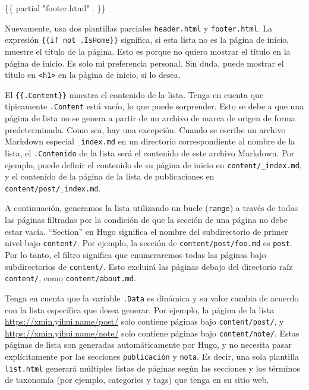 \documentclass[12pt,]{krantz}
\makeatletter
\newenvironment{Shaded}{\begin{snugshade}}{\end{snugshade}}
\newcommand{\NormalTok}[1]{#1}
\newenvironment{kframe}{%
\medskip{}
\setlength{\fboxsep}{.8em}
 \def\at@end@of@kframe{}%
 \ifinner\ifhmode%
  \def\at@end@of@kframe{\end{minipage}}%
  \begin{minipage}{\columnwidth}%
 \fi\fi%
 \def\FrameCommand##1{\hskip\@totalleftmargin \hskip-\fboxsep
 \colorbox{shadecolor}{##1}\hskip-\fboxsep
     \hskip-\linewidth \hskip-\@totalleftmargin \hskip\columnwidth}%
 \MakeFramed {\advance\hsize-\width
   \@totalleftmargin\z@ \linewidth\hsize
   \@setminipage}}%
 {\par\unskip\endMakeFramed%
 \at@end@of@kframe}
\renewenvironment{Shaded}{\begin{kframe}}{\end{kframe}}
\theoremstyle{definition}
\theoremstyle{definition}
\theoremstyle{definition}
\theoremstyle{remark}
\makeatother
\begin{document}
\begin{itemize}
\begin{itemize}
\begin{Shaded}
\begin{Highlighting}[]
\NormalTok{\{\{ partial "footer.html" . \}\}}
\end{Highlighting}
\end{Shaded}

    Nuevamente, usa dos plantillas parciales \texttt{header.html} y
    \texttt{footer.html}. La expresión \texttt{\{\{if\ not\ .IsHome\}\}}
    significa, si esta lista no es la página de inicio, muestre el
    título de la página. Esto es porque no quiero mostrar el título en
    la página de inicio. Es solo mi preferencia personal. Sin duda,
    puede mostrar el título en \texttt{\textless{}h1\textgreater{}} en
    la página de inicio, si lo desea.

    El \texttt{\{\{.Content\}\}} muestra el contenido de la lista. Tenga
    en cuenta que típicamente \texttt{.Content} está vacío, lo que puede
    sorprender. Esto se debe a que una página de lista no se genera a
    partir de un archivo de marca de origen de forma predeterminada.
    Como sea, hay una excepción. Cuando se escribe un archivo Markdown
    especial \texttt{\_index.md} en un directorio correspondiente al
    nombre de la lista, el \texttt{.Contenido} de la lista será el
    contenido de este archivo Markdown. Por ejemplo, puede definir el
    contenido de su página de inicio en \texttt{content/\_index.md}, y
    el contenido de la página de la lista de publicaciones en
    \texttt{content/post/\_index.md}.

    A continuación, generamos la lista utilizando un bucle
    (\texttt{range}) a través de todas las páginas filtradas por la
    condición de que la sección de una página no debe estar vacía.
    ``Section'' en Hugo significa el nombre del subdirectorio de primer
    nivel bajo \texttt{content/}. Por ejemplo, la sección de
    \texttt{content/post/foo.md} es \texttt{post}. Por lo tanto, el
    filtro significa que enumeraremos todas las páginas bajo
    subdirectorios de \texttt{content/}. Esto excluirá las páginas
    debajo del directorio raíz \texttt{content/}, como
    \texttt{content/about.md}.

    Tenga en cuenta que la variable \texttt{.Data} es dinámica y su
    valor cambia de acuerdo con la lista específica que desea generar.
    Por ejemplo, la página de la lista
    \url{https://xmin.yihui.name/post/} solo contiene páginas bajo
    \texttt{content/post/}, y \url{https://xmin.yihui.name/note/} solo
    contiene páginas bajo \texttt{content/note/}. Estas páginas de lista
    son generadas automáticamente por Hugo, y no necesita pasar
    explícitamente por las secciones \texttt{publicación} y
    \texttt{nota}. Es decir, una sola plantilla \texttt{list.html}
    generará múltiples listas de páginas según las secciones y los
    términos de taxonomía (por ejemplo, categories y tags) que tenga en
    su sitio web.


\end{itemize}
\end{itemize}
\end{document}
